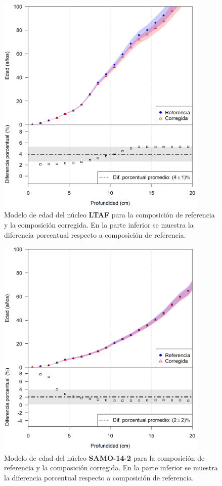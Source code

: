 \begin{figure}[h]
\centering
\includegraphics[width=0.9\textwidth]{Imagenes/LTAF_1.png}
\caption{Modelo de edad del núcleo \textbf{LTAF} para la composición de referencia y la composición corregida. En la parte inferior se muestra la diferencia porcentual respecto a composición de referencia.}\label{ModeloEdad-LTAF}
\end{figure}

\begin{figure}[h]
\centering
\includegraphics[width=0.9\textwidth]{Imagenes/SAMO142_1.png}
\caption{Modelo de edad del núcleo \textbf{SAMO-14-2} para la composición de referencia y la composición corregida. En la parte inferior se muestra la diferencia porcentual respecto a composición de referencia.}\label{ModeloEdad-SAMO}
\end{figure}

